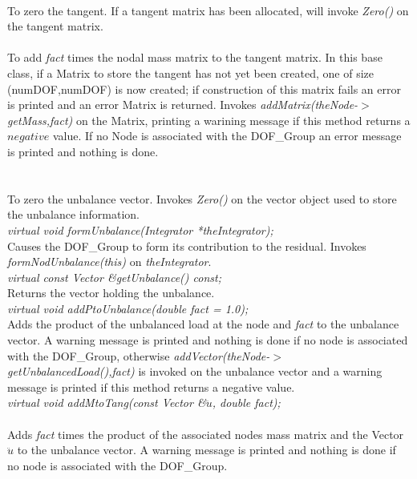\\
To zero the tangent. If a tangent matrix has been allocated,
will invoke {\em Zero()} on the tangent matrix.\\

\\
To add {\em fact} times the nodal mass matrix to the tangent
matrix. In this base class, if a Matrix to store the tangent has not
yet been created, one of size (numDOF,numDOF) is now created; if
construction of this matrix fails an error is printed and an error
Matrix is returned. Invokes {\em addMatrix(theNode-$>$getMass,fact)}
on the Matrix, printing a warining message if this method returns a
$negative$ value. If no Node is associated with the DOF\_Group an
error message is printed and nothing is done. \\

  \\
\\
To zero the unbalance vector. Invokes {\em Zero()} on the vector
object used to store the unbalance information. \\

{\em virtual void formUnbalance(Integrator *theIntegrator); }\\
Causes the DOF\_Group to form its contribution to the residual. Invokes
{\em formNodUnbalance(this)} on {\em theIntegrator}.\\

{\em virtual const Vector \&getUnbalance() const; } \\
Returns the vector holding the unbalance. \\

{\em virtual void  addPtoUnbalance(double fact = 1.0);} \\
Adds the product of the unbalanced load at the node and {\em fact} to
the unbalance vector. A warning message is printed and nothing is done
if no node is associated with the DOF\_Group, otherwise {\em
addVector(theNode-$>$getUnbalancedLoad(),fact)} is invoked on the
unbalance vector and a warning message is printed if this method
returns a negative value. \\ 

{\em virtual void addMtoTang(const Vector \&$\ddot u$,
double fact);}\\ \\ 
Adds {\em fact} times the product of the associated nodes mass matrix
and the Vector $\ddot u$ to the unbalance vector. A warning message is
printed and nothing is done if no node is associated with the
DOF\_Group. \\

